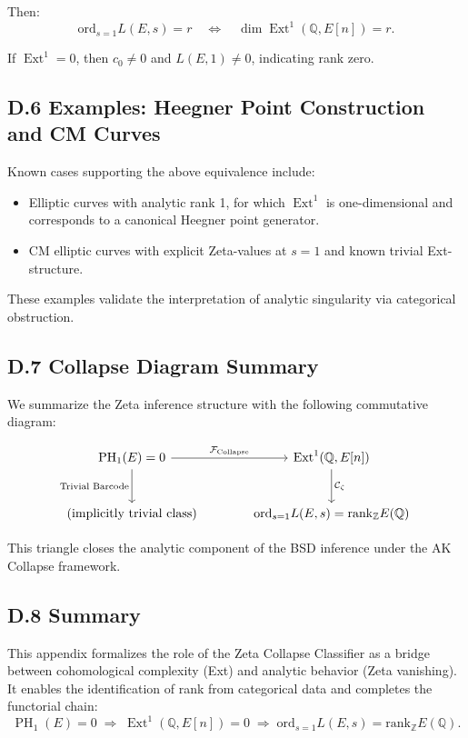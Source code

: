 \documentclass[11pt]{article}
\DeclareMathOperator{\Ext}{Ext}
\DeclareMathOperator{\PH}{PH}
\newcommand{\QQ}{\mathbb{Q}}
\newcommand{\ZZ}{\mathbb{Z}}
\begin{document}
Then:
\[
\mathrm{ord}_{s=1} L(E,s) = r \quad \Leftrightarrow \quad \dim \Ext^1(\QQ,E[n]) = r.
\]

If $\Ext^1 = 0$, then $c_0 \neq 0$ and $L(E,1) \neq 0$, indicating rank zero.

\subsection*{D.6 Examples: Heegner Point Construction and CM Curves}

Known cases supporting the above equivalence include:
\begin{itemize}
  \item Elliptic curves with analytic rank 1, for which $\Ext^1$ is one-dimensional and corresponds to a canonical Heegner point generator.
  \item CM elliptic curves with explicit Zeta-values at $s=1$ and known trivial Ext-structure.
\end{itemize}

These examples validate the interpretation of analytic singularity via categorical obstruction.

\subsection*{D.7 Collapse Diagram Summary}

We summarize the Zeta inference structure with the following commutative diagram:

\[
\begin{tikzcd}[row sep=large, column sep=large]
\PH_1(E) = 0
  \arrow[r, "\mathcal{F}_{\mathrm{Collapse}}"]
  \arrow[d, "\text{Trivial Barcode}"']
& \Ext^1(\QQ,E[n])
  \arrow[d, "\mathcal{C}_\zeta"] \\
\text{(implicitly trivial class)}
  \arrow[r, phantom, ""]
& \mathrm{ord}_{s=1} L(E,s) = \mathrm{rank}_{\ZZ} E(\QQ)
\end{tikzcd}
\]


This triangle closes the analytic component of the BSD inference under the AK Collapse framework.

\subsection*{D.8 Summary}

This appendix formalizes the role of the Zeta Collapse Classifier as a bridge between cohomological complexity (Ext) and analytic behavior (Zeta vanishing).  
It enables the identification of rank from categorical data and completes the functorial chain:  
\[
\PH_1(E) = 0 \;\Rightarrow\; \Ext^1(\QQ,E[n]) = 0 \;\Rightarrow\; \mathrm{ord}_{s=1} L(E,s) = \mathrm{rank}_{\ZZ} E(\QQ).
\]
\end{document}
